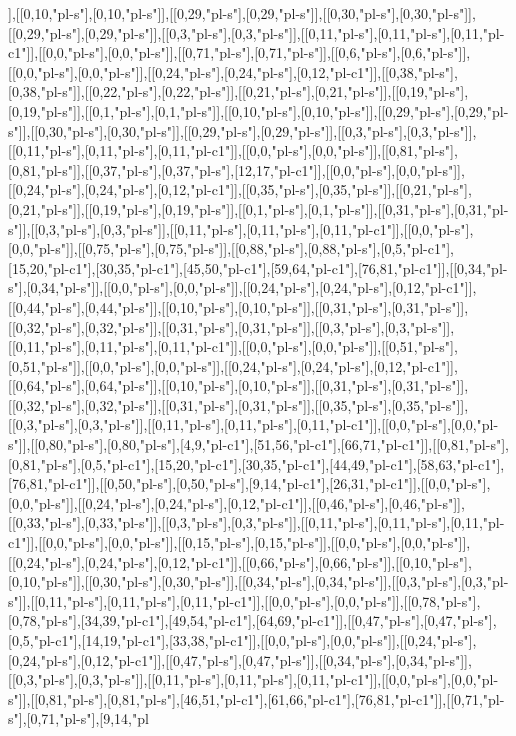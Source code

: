 ],[[0,10,"pl-s"],[0,10,"pl-s"]],[[0,29,"pl-s"],[0,29,"pl-s"]],[[0,30,"pl-s"],[0,30,"pl-s"]],[[0,29,"pl-s"],[0,29,"pl-s"]],[[0,3,"pl-s"],[0,3,"pl-s"]],[[0,11,"pl-s"],[0,11,"pl-s"],[0,11,"pl-c1"]],[[0,0,"pl-s"],[0,0,"pl-s"]],[[0,71,"pl-s"],[0,71,"pl-s"]],[[0,6,"pl-s"],[0,6,"pl-s"]],[[0,0,"pl-s"],[0,0,"pl-s"]],[[0,24,"pl-s"],[0,24,"pl-s"],[0,12,"pl-c1"]],[[0,38,"pl-s"],[0,38,"pl-s"]],[[0,22,"pl-s"],[0,22,"pl-s"]],[[0,21,"pl-s"],[0,21,"pl-s"]],[[0,19,"pl-s"],[0,19,"pl-s"]],[[0,1,"pl-s"],[0,1,"pl-s"]],[[0,10,"pl-s"],[0,10,"pl-s"]],[[0,29,"pl-s"],[0,29,"pl-s"]],[[0,30,"pl-s"],[0,30,"pl-s"]],[[0,29,"pl-s"],[0,29,"pl-s"]],[[0,3,"pl-s"],[0,3,"pl-s"]],[[0,11,"pl-s"],[0,11,"pl-s"],[0,11,"pl-c1"]],[[0,0,"pl-s"],[0,0,"pl-s"]],[[0,81,"pl-s"],[0,81,"pl-s"]],[[0,37,"pl-s"],[0,37,"pl-s"],[12,17,"pl-c1"]],[[0,0,"pl-s"],[0,0,"pl-s"]],[[0,24,"pl-s"],[0,24,"pl-s"],[0,12,"pl-c1"]],[[0,35,"pl-s"],[0,35,"pl-s"]],[[0,21,"pl-s"],[0,21,"pl-s"]],[[0,19,"pl-s"],[0,19,"pl-s"]],[[0,1,"pl-s"],[0,1,"pl-s"]],[[0,31,"pl-s"],[0,31,"pl-s"]],[[0,3,"pl-s"],[0,3,"pl-s"]],[[0,11,"pl-s"],[0,11,"pl-s"],[0,11,"pl-c1"]],[[0,0,"pl-s"],[0,0,"pl-s"]],[[0,75,"pl-s"],[0,75,"pl-s"]],[[0,88,"pl-s"],[0,88,"pl-s"],[0,5,"pl-c1"],[15,20,"pl-c1"],[30,35,"pl-c1"],[45,50,"pl-c1"],[59,64,"pl-c1"],[76,81,"pl-c1"]],[[0,34,"pl-s"],[0,34,"pl-s"]],[[0,0,"pl-s"],[0,0,"pl-s"]],[[0,24,"pl-s"],[0,24,"pl-s"],[0,12,"pl-c1"]],[[0,44,"pl-s"],[0,44,"pl-s"]],[[0,10,"pl-s"],[0,10,"pl-s"]],[[0,31,"pl-s"],[0,31,"pl-s"]],[[0,32,"pl-s"],[0,32,"pl-s"]],[[0,31,"pl-s"],[0,31,"pl-s"]],[[0,3,"pl-s"],[0,3,"pl-s"]],[[0,11,"pl-s"],[0,11,"pl-s"],[0,11,"pl-c1"]],[[0,0,"pl-s"],[0,0,"pl-s"]],[[0,51,"pl-s"],[0,51,"pl-s"]],[[0,0,"pl-s"],[0,0,"pl-s"]],[[0,24,"pl-s"],[0,24,"pl-s"],[0,12,"pl-c1"]],[[0,64,"pl-s"],[0,64,"pl-s"]],[[0,10,"pl-s"],[0,10,"pl-s"]],[[0,31,"pl-s"],[0,31,"pl-s"]],[[0,32,"pl-s"],[0,32,"pl-s"]],[[0,31,"pl-s"],[0,31,"pl-s"]],[[0,35,"pl-s"],[0,35,"pl-s"]],[[0,3,"pl-s"],[0,3,"pl-s"]],[[0,11,"pl-s"],[0,11,"pl-s"],[0,11,"pl-c1"]],[[0,0,"pl-s"],[0,0,"pl-s"]],[[0,80,"pl-s"],[0,80,"pl-s"],[4,9,"pl-c1"],[51,56,"pl-c1"],[66,71,"pl-c1"]],[[0,81,"pl-s"],[0,81,"pl-s"],[0,5,"pl-c1"],[15,20,"pl-c1"],[30,35,"pl-c1"],[44,49,"pl-c1"],[58,63,"pl-c1"],[76,81,"pl-c1"]],[[0,50,"pl-s"],[0,50,"pl-s"],[9,14,"pl-c1"],[26,31,"pl-c1"]],[[0,0,"pl-s"],[0,0,"pl-s"]],[[0,24,"pl-s"],[0,24,"pl-s"],[0,12,"pl-c1"]],[[0,46,"pl-s"],[0,46,"pl-s"]],[[0,33,"pl-s"],[0,33,"pl-s"]],[[0,3,"pl-s"],[0,3,"pl-s"]],[[0,11,"pl-s"],[0,11,"pl-s"],[0,11,"pl-c1"]],[[0,0,"pl-s"],[0,0,"pl-s"]],[[0,15,"pl-s"],[0,15,"pl-s"]],[[0,0,"pl-s"],[0,0,"pl-s"]],[[0,24,"pl-s"],[0,24,"pl-s"],[0,12,"pl-c1"]],[[0,66,"pl-s"],[0,66,"pl-s"]],[[0,10,"pl-s"],[0,10,"pl-s"]],[[0,30,"pl-s"],[0,30,"pl-s"]],[[0,34,"pl-s"],[0,34,"pl-s"]],[[0,3,"pl-s"],[0,3,"pl-s"]],[[0,11,"pl-s"],[0,11,"pl-s"],[0,11,"pl-c1"]],[[0,0,"pl-s"],[0,0,"pl-s"]],[[0,78,"pl-s"],[0,78,"pl-s"],[34,39,"pl-c1"],[49,54,"pl-c1"],[64,69,"pl-c1"]],[[0,47,"pl-s"],[0,47,"pl-s"],[0,5,"pl-c1"],[14,19,"pl-c1"],[33,38,"pl-c1"]],[[0,0,"pl-s"],[0,0,"pl-s"]],[[0,24,"pl-s"],[0,24,"pl-s"],[0,12,"pl-c1"]],[[0,47,"pl-s"],[0,47,"pl-s"]],[[0,34,"pl-s"],[0,34,"pl-s"]],[[0,3,"pl-s"],[0,3,"pl-s"]],[[0,11,"pl-s"],[0,11,"pl-s"],[0,11,"pl-c1"]],[[0,0,"pl-s"],[0,0,"pl-s"]],[[0,81,"pl-s"],[0,81,"pl-s"],[46,51,"pl-c1"],[61,66,"pl-c1"],[76,81,"pl-c1"]],[[0,71,"pl-s"],[0,71,"pl-s"],[9,14,"pl